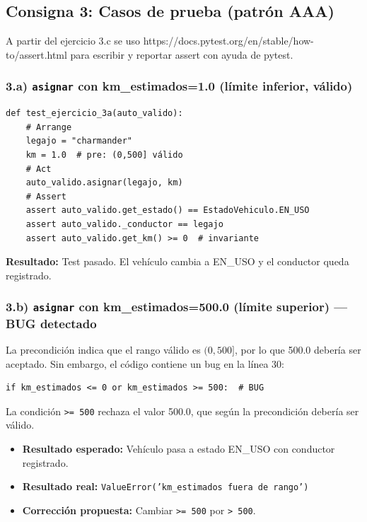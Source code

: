 \subsection{Consigna 3: Casos de prueba (patrón AAA)}

A partir del ejercicio 3.c se uso https://docs.pytest.org/en/stable/how-to/assert.html para escribir y reportar assert con ayuda de pytest.

\subsubsection*{3.a) \texttt{asignar} con km\_estimados=1.0 (límite inferior, válido)}

\begin{verbatim}
def test_ejercicio_3a(auto_valido):
    # Arrange
    legajo = "charmander"
    km = 1.0  # pre: (0,500] válido
    # Act
    auto_valido.asignar(legajo, km)
    # Assert
    assert auto_valido.get_estado() == EstadoVehiculo.EN_USO
    assert auto_valido._conductor == legajo
    assert auto_valido.get_km() >= 0  # invariante
\end{verbatim}

\textbf{Resultado:} Test pasado. El vehículo cambia a EN\_USO y el conductor queda registrado.

\subsubsection*{3.b) \texttt{asignar} con km\_estimados=500.0 (límite superior) --- BUG detectado}

La precondición indica que el rango válido es $(0, 500]$, por lo que 500.0 debería ser aceptado. Sin embargo, el código contiene un bug en la línea 30:

\begin{verbatim}
if km_estimados <= 0 or km_estimados >= 500:  # BUG
\end{verbatim}

La condición \texttt{>= 500} rechaza el valor 500.0, que según la precondición debería ser válido.

\begin{itemize}
    \item \textbf{Resultado esperado:} Vehículo pasa a estado EN\_USO con conductor registrado.
    \item \textbf{Resultado real:} \texttt{ValueError('km\_estimados fuera de rango')}
    \item \textbf{Corrección propuesta:} Cambiar \texttt{>= 500} por \texttt{> 500}.
\end{itemize}

